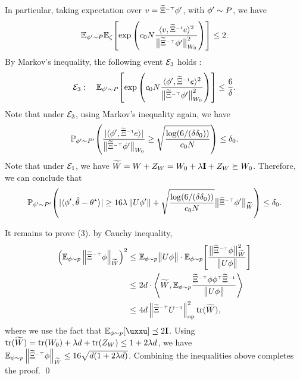 In particular, taking expectation over $v={\til \Xi}\itp \x'$, with $\x'\sim P$, we have
\begin{align*}
    \EE_{\x'\sim P}\EE_\zeta\brac{ \exp\paren{ c_0N\frac{\lr v,{\til \Xi}\iv e\rr^2}{\nrmn{{\til \Xi}\itp \x'}_{W_0}^2} } }\leq 2.
\end{align*}
By Markov's inequality, the following event $\cE_3$ holds \whp:
\begin{align*}
    \cE_3:\quad \EE_{\x'\sim P}\brac{ \exp\paren{ c_0N\frac{\lr \x',{\til \Xi}\iv e\rr^2}{\nrmn{{\til \Xi}\itp \x'}_{W_0}^2} } } \leq \frac{6}{\delta}.
\end{align*}
Note that under $\cE_3$, using Markov's inequality again, we have
\begin{align*}
    \PP_{\x'\sim P'}\paren{ \frac{\absn{\lr \x',{\til \Xi}\iv e\rr}}{\nrmn{{\til \Xi}\itp \x'}_{W_0}}\geq \sqrt{\frac{\log(6/(\delta\delz))}{c_0N}} }\leq \delz.
\end{align*}
Note that under $\cE_1$, we have $\til W=W+Z_W=W_0+\lambda\id+Z_W\succeq W_0$.
Therefore, we can conclude that
\begin{align*}
    \PP_{\x'\sim P'}\paren{ \absn{\lr \x',\hth-\ths\rr}\geq 16\lambda\nrm{U\x'}+\sqrt{\frac{\log(6/(\delta\delz))}{c_0N}}\nrmn{{\til \Xi}\itp \x'}_{\til W} }\leq \delz.
\end{align*}

It remains to prove (3). by Cauchy inequality,
\begin{align*}
    \paren{ \Epp{ \nrm{{\til \Xi}\itp \x}_{\til W} } }^2
    \leq&~ \Epp{\nrmn{U \x}} \cdot \Ep{ \frac{\nrmn{{\til \Xi}\itp \x}_{\til W}^2}{\nrmn{U \x}} } \\
    \leq&~ 2d\cdot \llr \til W, \Epp{ \frac{{\til \Xi}\itp \x\x\tp {\til \Xi}\iv}{\nrmn{U \x}} }\rrr \\
    \leq&~ 4d\nrmop{{\til \Xi}\itp U\iv}^2\tr(\til W),
\end{align*}
where we use the fact that $\Ep{\uxxu}\preceq 2\id$. Using $\tr(\til W)=\tr(W_0)+\lambda d+\tr(Z_W)\leq 1+2\lambda d$, we have $\Epp{ \nrm{{\til \Xi}\itp \x}_{\til W} }\leq 16\sqrt{d(1+2\lambda d)}$. Combining the inequalities above completes the proof.
\qed

